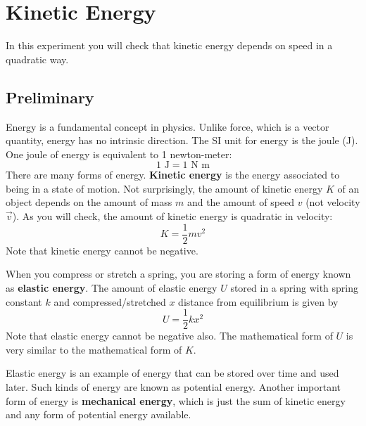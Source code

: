 \setcounter{chapter}{6}
\chapter{Kinetic Energy}
In this experiment you will check that kinetic energy depends on speed in a quadratic way.
\section{Preliminary}
Energy is a fundamental concept in physics. Unlike force, which is a vector quantity, energy has no intrinsic direction. The SI unit for energy is the joule (J). One joule of energy is equivalent to 1 newton-meter:
\begin{equation}
    1 \text{ J} = 1 \text{ N m}
\end{equation}
There are many forms of energy. \textbf{Kinetic energy} is the energy associated to being in a state of motion. Not surprisingly, the amount of kinetic energy $K$ of an object depends on the amount of mass $m$ and the amount of speed $v$ (not velocity $\vec{v}$). As you will check, the amount of kinetic energy is quadratic in velocity:
\begin{equation}
    K = \frac{1}{2} m v^{2}
\end{equation}
Note that kinetic energy cannot be negative.

When you compress or stretch a spring, you are storing a form of energy known as \textbf{elastic energy}. The amount of elastic energy $U$ stored in a spring with spring constant $k$ and compressed/stretched $x$ distance from equilibrium is given by
\begin{equation}
    U = \frac{1}{2} k x^{2}
\end{equation}
Note that elastic energy cannot be negative also. The mathematical form of $U$ is very similar to the mathematical form of $K$.

Elastic energy is an example of energy that can be stored over time and used later. Such kinds of energy are known as potential energy. Another important form of energy is \textbf{mechanical energy}, which is just the sum of kinetic energy and any form of potential energy available.
